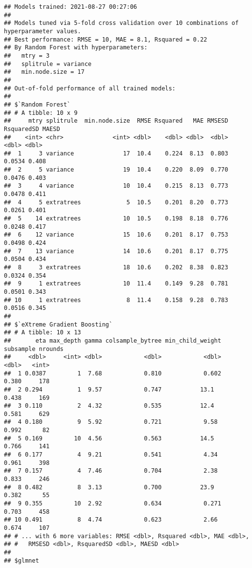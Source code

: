 \documentclass[
]{article}
\begin{document}
\begin{verbatim}
## Models trained: 2021-08-27 00:27:06
## 
## Models tuned via 5-fold cross validation over 10 combinations of hyperparameter values.
## Best performance: RMSE = 10, MAE = 8.1, Rsquared = 0.22
## By Random Forest with hyperparameters:
##   mtry = 3
##   splitrule = variance
##   min.node.size = 17
## 
## Out-of-fold performance of all trained models:
## 
## $`Random Forest`
## # A tibble: 10 x 9
##     mtry splitrule  min.node.size  RMSE Rsquared   MAE RMSESD RsquaredSD MAESD
##    <int> <chr>              <int> <dbl>    <dbl> <dbl>  <dbl>      <dbl> <dbl>
##  1     3 variance              17  10.4    0.224  8.13  0.803     0.0534 0.408
##  2     5 variance              19  10.4    0.220  8.09  0.770     0.0476 0.403
##  3     4 variance              10  10.4    0.215  8.13  0.773     0.0478 0.411
##  4     5 extratrees             5  10.5    0.201  8.20  0.773     0.0261 0.401
##  5    14 extratrees            10  10.5    0.198  8.18  0.776     0.0248 0.417
##  6    12 variance              15  10.6    0.201  8.17  0.753     0.0498 0.424
##  7    13 variance              14  10.6    0.201  8.17  0.775     0.0504 0.434
##  8     3 extratrees            18  10.6    0.202  8.38  0.823     0.0324 0.354
##  9     1 extratrees            10  11.4    0.149  9.28  0.781     0.0501 0.343
## 10     1 extratrees             8  11.4    0.158  9.28  0.783     0.0516 0.345
## 
## $`eXtreme Gradient Boosting`
## # A tibble: 10 x 13
##       eta max_depth gamma colsample_bytree min_child_weight subsample nrounds
##     <dbl>     <int> <dbl>            <dbl>            <dbl>     <dbl>   <int>
##  1 0.0387         1  7.68            0.810            0.602     0.380     178
##  2 0.294          1  9.57            0.747           13.1       0.438     169
##  3 0.110          2  4.32            0.535           12.4       0.581     629
##  4 0.180          9  5.92            0.721            9.58      0.992      82
##  5 0.169         10  4.56            0.563           14.5       0.766     141
##  6 0.177          4  9.21            0.541            4.34      0.961     398
##  7 0.157          4  7.46            0.704            2.38      0.833     246
##  8 0.482          8  3.13            0.700           23.9       0.382      55
##  9 0.355         10  2.92            0.634            0.271     0.703     458
## 10 0.491          8  4.74            0.623            2.66      0.674     107
## # ... with 6 more variables: RMSE <dbl>, Rsquared <dbl>, MAE <dbl>,
## #   RMSESD <dbl>, RsquaredSD <dbl>, MAESD <dbl>
## 
## $glmnet

\end{verbatim}
\end{document}
